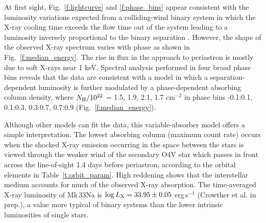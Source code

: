 \documentclass[fleqn,usenatbib]{mnras}
\begin{document}
At first sight, Fig.~\ref{f:lightcurve} and \ref{f:phase_bins} appear consistent with the luminosity variations expected from a colliding-wind binary system in which the X-ray cooling time exceeds the flow time out of the system leading to a luminosity inversely proportional to the binary separation \citep[e.g.][]{stevens1992}. However, the shape of the observed X-ray spectrum varies with phase as shown in Fig.~\ref{f:median_energy}. The rise in flux in the approach to periastron is mostly due to soft X-rays near 1 keV. Spectral analysis performed in four broad phase bins reveals that the data are consistent with a model in which a separation-dependent luminosity is further modulated by a phase-dependent absorbing column density, where $N_{\rm H} / 10^{22}$ = 1.5, 1.9, 2.1, 1.7 cm$^{-2}$ in phase bins -0.1:0.1, 0.1:0.3, 0.3:0.7, 0.7:0.9 (Fig.~\ref{f:median_energy}).

Although other models can fit the data, this variable-absorber model offers a simple interpretation. The lowest absorbing column (maximum count rate) occurs when the shocked X-ray emission occurring in the space between the stars is viewed through the weaker wind of the secondary O4V star which passes in front across the line-of-sight 1.4 days before periastron, according to the orbital elements in Table~\ref{t:orbit_param}. High reddening shows that the interstellar medium accounts for much of the observed X-ray absorption. The time-averaged X-ray luminosity of Mk\,33Na is $\log L_{\rm X} = 33.95 \pm 0.05$ erg\,s$^{-1}$ (Crowther et al. in prep.), a value more typical of binary systems than the lower intrinsic luminosities of single stars.


\end{document}
